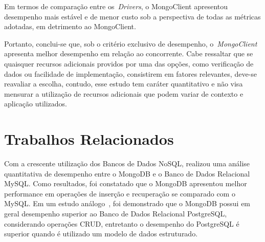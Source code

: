 \documentclass[12pt]{article}
\begin{document}
Em termos de comparação entre os~\emph{Drivers}, o MongoClient apresentou desempenho mais estável e de menor custo sob a perspectiva de todas as métricas adotadas, em detrimento ao MongoClient.

Portanto, conclui-se que, sob o critério exclusivo de desempenho, o~\emph{MongoClient} apresenta melhor desempenho em relação ao concorrente.
Cabe ressaltar que se quaisquer recursos adicionais providos por uma das opções, como verificação de dados ou facilidade de implementação, consistirem em fatores relevantes, deve-se reavaliar a escolha, contudo, esse estudo tem caráter quantitativo e não visa mensurar a utilização de recursos adicionais que podem variar de contexto e aplicação utilizados.




\section{Trabalhos Relacionados} 
\label{section:relacionados}

Com a crescente utilização dos Bancos de Dados NoSQL, \cite{patil:2017} realizou uma análise quantitativa de desempenho entre o MongoDB e o Banco de Dados Relacional MySQL. Como resultados, foi constatado que o MongoDB apresentou melhor performance em operações de inserção e recuperação se comparado com o MySQL. Em um estudo análogo~\cite{jung:2015}, foi demonstrado que o MongoDB possui em geral desempenho superior ao Banco de Dados Relacional PostgreSQL, considerando operações CRUD, entretanto o desempenho do PostgreSQL é superior quando é utilizado um modelo de dados estruturado.
\end{document}
